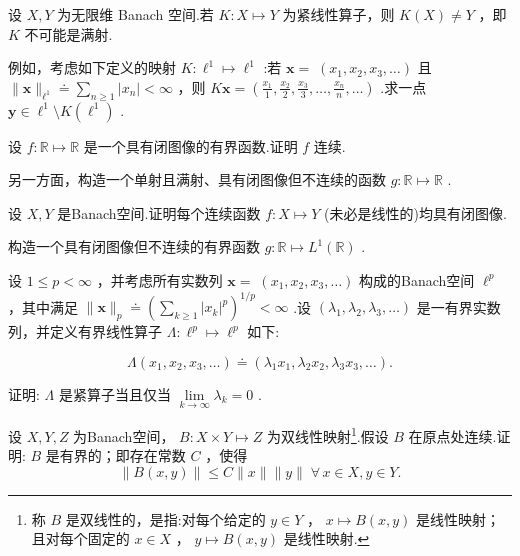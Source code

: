 \begin{rbhw}
设 $X,Y$ 为无限维 Banach 空间.若 $K : X \mapsto  Y$ 为紧线性算子，则 $K\left( X\right)  \neq  Y$ ，即 $K$ 不可能是满射.

例如，考虑如下定义的映射 $K : {\ell }^{1} \mapsto  {\ell }^{1}$ :若 $\bm{x} = \; \left( {{x}_{1},{x}_{2},{x}_{3},\ldots }\right)$ 且 $\| \bm{x}{\| }_{{\ell }^{1}} \doteq  \mathop{\sum }\limits_{{n \geq  1}}\left| {x}_{n}\right|  < \infty$ ，则 $K\bm{x} = \left( {\frac{{x}_{1}}{1},\frac{{x}_{2}}{2},\frac{{x}_{3}}{3},\ldots ,\frac{{x}_{n}}{n},\ldots }\right)$ .求一点 $\bm{y} \in  {\ell }^{1} \setminus  K\left( {\ell }^{1}\right)$ .
\end{rbhw}

\begin{rbhw}
设 $f : \mathbb{R} \mapsto  \mathbb{R}$ 是一个具有闭图像的有界函数.证明 $f$ 连续.

另一方面，构造一个单射且满射、具有闭图像但不连续的函数 $g : \mathbb{R} \mapsto  \mathbb{R}$ .
\end{rbhw}

\begin{rbhw}
设 $X,Y$ 是Banach空间.证明每个连续函数 $f : X \mapsto  Y$ (未必是线性的)均具有闭图像.

构造一个具有闭图像但不连续的有界函数 $g : \mathbb{R} \mapsto  {L}^{1}\left( \mathbb{R}\right)$ .
\end{rbhw}

\begin{rbhw}
设 $1 \leq  p < \infty$ ，并考虑所有实数列 $\bm{x} = \; \left( {{x}_{1},{x}_{2},{x}_{3},\ldots }\right)$ 构成的Banach空间 ${\ell }^{p}$，其中满足 $\| \bm{x}{\| }_{p} \doteq  {\left( \mathop{\sum }\limits_{{k \geq  1}}{\left| {x}_{k}\right| }^{p}\right) }^{1/p} < \infty$ .设 $\left( {{\lambda }_{1},{\lambda }_{2},{\lambda }_{3},\ldots }\right)$ 是一有界实数列，并定义有界线性算子 $\Lambda  : {\ell }^{p} \mapsto  {\ell }^{p}$ 如下:

\[
\Lambda \left( {{x}_{1},{x}_{2},{x}_{3},\ldots }\right)  \doteq  \left( {{\lambda }_{1}{x}_{1},{\lambda }_{2}{x}_{2},{\lambda }_{3}{x}_{3},\ldots }\right) .
\]

证明: $\Lambda$ 是紧算子当且仅当 $\mathop{\lim }\limits_{{k \rightarrow  \infty }}{\lambda }_{k} = 0$ .
\end{rbhw}

\begin{rbhw}
设 $X,Y,Z$ 为Banach空间， $B : X \times  Y \mapsto  Z$ 为双线性映射\footnote{称 $B$ 是双线性的，是指:对每个给定的 $y \in  Y$ ， $x \mapsto  B\left( {x,y}\right)$ 是线性映射；且对每个固定的 $x \in  X$ ， $y \mapsto  B\left( {x,y}\right)$ 是线性映射.}.假设 $B$ 在原点处连续.证明: $B$ 是有界的；即存在常数 $C$ ，使得
\[
\| B\left( {x,y}\right) \|  \leq  C\| x\| \| y\| \;\forall\,x \in  X,y \in  Y.
\]

\end{rbhw}

